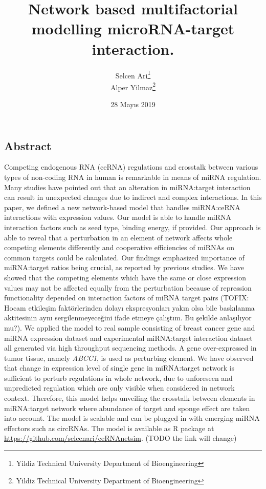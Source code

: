 \documentclass[]{article}
\title{Network based multifactorial modelling microRNA-target interaction.}
\author{Selcen Ari\footnote{Yildiz Technical University Department of
  Bioengineering} \\ Alper Yilmaz\footnote{Yildiz Technical University Department of
  Bioengineering}}
\date{28 Mayıs 2019}
\begin{document}
\maketitle

\hypertarget{abstract}{%
\subsection{Abstract}\label{abstract}}

Competing endogenous RNA (ceRNA) regulations and crosstalk between
various types of non-coding RNA in human is remarkable in means of miRNA
regulation. Many studies have pointed out that an alteration in
miRNA:target interaction can result in unexpected changes due to
indirect and complex interactions. In this paper, we defined a new
network-based model that handles miRNA:ceRNA interactions with
expression values. Our model is able to handle miRNA interaction factors
such as seed type, binding energy, if provided. Our approach is able to
reveal that a perturbation in an element of network affects whole
competing elements differently and cooperative efficiencies of miRNAs on
common targets could be calculated. Our findings emphasized importance
of miRNA:target ratios being crucial, as reported by previous studies.
We have showed that the competing elements which have the same or close
expression values may not be affected equally from the perturbation
because of repression functionality depended on interaction factors of
miRNA target pairs (TOFIX: Hocam etkileşim faktörlerinden dolayı
ekspresyonları yakın olsa bile baskılanma aktitesinin aynı
sergilenmeyeceğini ifade etmeye çalıştım. Bu şekilde anlaşılıyor mu?).
We applied the model to real sample consisting of breast cancer gene and
miRNA expression dataset and experimental miRNA:target interaction
dataset all generated via high throughput sequencing methods. A gene
over-expressed in tumor tissue, namely \emph{ABCC1}, is used as
perturbing element. We have observed that change in expression level of
single gene in miRNA:target network is sufficient to perturb regulations
in whole network, due to unforeseen and unpredicted regulation which are
only visible when considered in network context. Therefore, this model
helps unveiling the crosstalk between elements in miRNA:target network
where abundance of target and sponge effect are taken into account. The
model is scalable and can be plugged in with emerging miRNA effectors
such as circRNAs. The model is available as R package at
\url{https://github.com/selcenari/ceRNAnetsim}. (TODO the link will
change)
\end{document}
